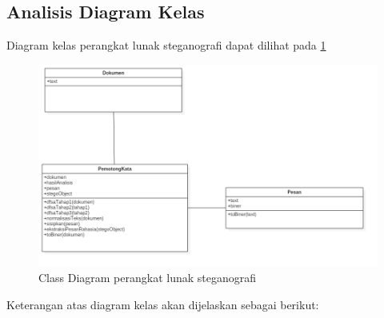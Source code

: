 \subsection{Analisis Diagram Kelas}

Diagram kelas perangkat lunak steganografi dapat dilihat pada \ref{fig:3_classdiagram}

\begin{figure}[H]
	\centering
	\includegraphics[scale=0.5]{Gambar/classdiagram}
	\caption{Class Diagram perangkat lunak steganografi} 
	\label{fig:3_classdiagram}
\end{figure}

Keterangan atas diagram kelas akan dijelaskan sebagai berikut:

